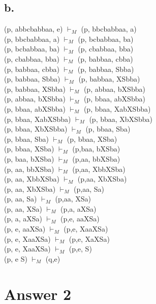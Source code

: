 \documentclass[12pt]{article}
\begin{document}
\subsection*{b.}
(p, abbcbabbaa, e) $\vdash_M$ (p, bbcbabbaa, a) \\
(p, bbcbabbaa, a) $\vdash_M$ (p, bcbabbaa, ba) \\
(p, bcbabbaa, ba) $\vdash_M$ (p, cbabbaa, bba) \\
(p, cbabbaa, bba) $\vdash_M$ (p, babbaa, cbba) \\
(p, babbaa, cbba) $\vdash_M$ (p, babbaa, Sbba) \\
(p, babbaa, Sbba) $\vdash_M$ (p, babbaa, XSbba) \\
(p, babbaa, XSbba) $\vdash_M$ (p, abbaa, bXSbba) \\
(p, abbaa, bXSbba) $\vdash_M$ (p, bbaa, abXSbba) \\
(p, bbaa, abXSbba) $\vdash_M$ (p, bbaa, XabXSbba) \\
(p, bbaa, XabXSbba) $\vdash_M$ (p, bbaa, XbXSbba) \\
(p, bbaa, XbXSbba) $\vdash_M$ (p, bbaa, Sba) \\
(p, bbaa, Sba) $\vdash_M$ (p, bbaa, XSba) \\
(p, bbaa, XSba) $\vdash_M$ (p,baa, bXSba) \\
(p, baa, bXSba) $\vdash_M$ (p,aa, bbXSba) \\
(p, aa, bbXSba) $\vdash_M$ (p,aa, XbbXSba) \\
(p, aa, XbbXSba) $\vdash_M$ (p,aa, XbXSba) \\
(p, aa, XbXSba) $\vdash_M$ (p,aa, Sa) \\
(p, aa, Sa) $\vdash_M$ (p,aa, XSa) \\
(p, aa, XSa) $\vdash_M$ (p,a, aXSa) \\
(p, a, aXSa) $\vdash_M$ (p,e, aaXSa) \\
(p, e, aaXSa) $\vdash_M$ (p,e, XaaXSa) \\
(p, e, XaaXSa) $\vdash_M$ (p,e, XaXSa) \\
(p, e, XaaXSa) $\vdash_M$ (p,e, S) \\
(p, e S) $\vdash_M$ (q,e) \\

\section*{Answer 2}
\end{document}
